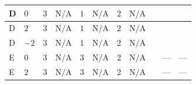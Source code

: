 \documentclass[8pt]{article}
\begin{document}
\begin{landscape}
\begin{longtable}{@{}llcccccc >{\raggedright\arraybackslash}p{0.21\linewidth} >{\raggedright\arraybackslash}p{0.21\linewidth} >{\raggedright\arraybackslash}p{0.21\linewidth}@{}}
\midrule
D & $0$ & $3$ & $\text{N/A}$ & $1$ & $\text{N/A}$ & $2$ & $\text{N/A}$ & \scriptsize\adjustbox{max width=\linewidth}{$\begin{gathered} +4 {\lambda_{12}^{(1)}}^2\end{gathered}$} & \scriptsize\adjustbox{max width=\linewidth}{$\begin{gathered} +8 {\lambda_{12}^{(1)}} {\lambda_{S_1}^{(1)}}\end{gathered}$} & \scriptsize\adjustbox{max width=\linewidth}{$\begin{gathered} +4 {\lambda_{12}^{(1)}} {\lambda_{S_2}^{(1)}}\end{gathered}$} \\
\midrule
D & $2$ & $3$ & $\text{N/A}$ & $1$ & $\text{N/A}$ & $2$ & $\text{N/A}$ & \scriptsize\adjustbox{max width=\linewidth}{$\begin{gathered} +4 {\lambda_{12}^{(1)}}^2\end{gathered}$} & \scriptsize\adjustbox{max width=\linewidth}{$\begin{gathered} +8 {\lambda_{12}^{(1)}} {\lambda_{S_1}^{(1)}}\end{gathered}$} & \scriptsize\adjustbox{max width=\linewidth}{$\begin{gathered} +4 {\lambda_{12}^{(1)}} {\lambda_{S_2}^{(1)}}\end{gathered}$} \\
\midrule
D & $-2$ & $3$ & $\text{N/A}$ & $1$ & $\text{N/A}$ & $2$ & $\text{N/A}$ & \scriptsize\adjustbox{max width=\linewidth}{$\begin{gathered} +4 {\lambda_{12}^{(1)}}^2\end{gathered}$} & \scriptsize\adjustbox{max width=\linewidth}{$\begin{gathered} +8 {\lambda_{12}^{(1)}} {\lambda_{S_1}^{(1)}}\end{gathered}$} & \scriptsize\adjustbox{max width=\linewidth}{$\begin{gathered} +4 {\lambda_{12}^{(1)}} {\lambda_{S_2}^{(1)}}\end{gathered}$} \\
\midrule
E & $0$ & $3$ & $\text{N/A}$ & $3$ & $\text{N/A}$ & $2$ & $\text{N/A}$ & \scriptsize\adjustbox{max width=\linewidth}{$\begin{gathered} +4 {\lambda_{12}^{(1)}}^2\end{gathered}$} & --- & --- \\
\midrule
E & $2$ & $3$ & $\text{N/A}$ & $3$ & $\text{N/A}$ & $2$ & $\text{N/A}$ & \scriptsize\adjustbox{max width=\linewidth}{$\begin{gathered} +4 {\lambda_{12}^{(1)}}^2\end{gathered}$} & --- & --- \\

\end{longtable}
\end{landscape}
\end{document}

